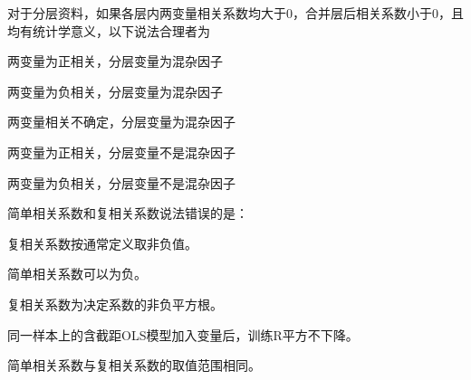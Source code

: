 \par\addvspace{6pt}\noindent\begin{minipage}{\linewidth}


对于分层资料，如果各层内两变量相关系数均大于0，合并层后相关系数小于0，且均有统计学意义，以下说法合理者为


\begin{choices}

\item 两变量为正相关，分层变量为混杂因子

\item 两变量为负相关，分层变量为混杂因子

\item 两变量相关不确定，分层变量为混杂因子

\item 两变量为正相关，分层变量不是混杂因子

\item 两变量为负相关，分层变量不是混杂因子

\end{choices}

\end{minipage}\par\vspace{4pt}

\par\addvspace{6pt}\noindent\begin{minipage}{\linewidth}


简单相关系数和复相关系数说法错误的是：\begin{choices}

\item 复相关系数按通常定义取非负值。

\item 简单相关系数可以为负。

\item 复相关系数为决定系数的非负平方根。

\item 同一样本上的含截距OLS模型加入变量后，训练R平方不下降。

\item 简单相关系数与复相关系数的取值范围相同。

\end{choices}

\end{minipage}\par\vspace{4pt}

